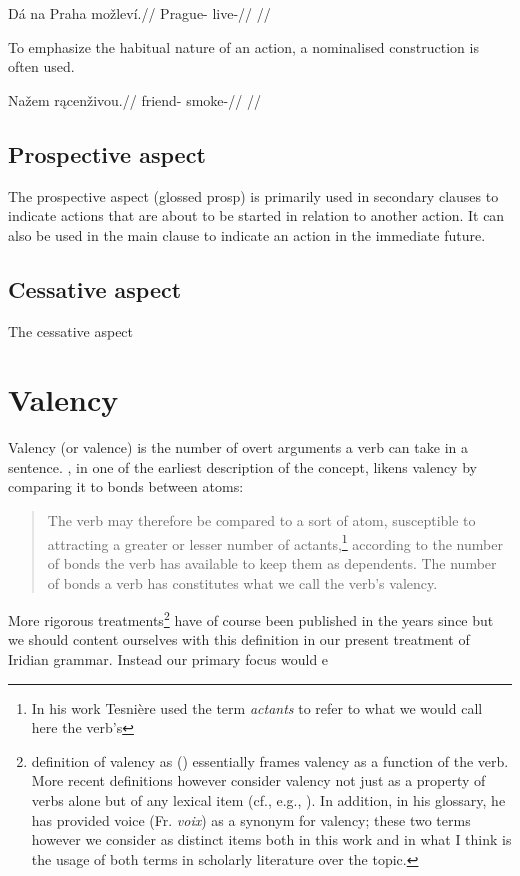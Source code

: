 \pex
\begingl
\gla Dá na Praha možleví.//
\glb {} \Loc{} Prague-\Acc{} live-//
\glft {} //
\endgl
\xe

To emphasize the habitual nature of an action, a nominalised construction is often used.

\pex
\begingl
\gla Nažem r\k{a}cenživou.//
\glb friend-\First{}\Sg{} smoke-//
\glft {} //
\endgl
\xe

\subsection{Prospective aspect}
\par The prospective aspect (glossed {\sc prosp}) is primarily used in secondary clauses to indicate actions that are about to be started in relation to another action. It can also be used in the main clause to indicate an action in the immediate future.

\subsection{Cessative aspect}
The cessative aspect

\section{Valency}

Valency (or valence) is the number of overt arguments a verb can take in a sentence. \textcite[239]{tesniere1965}, in one of the earliest description of the concept, likens valency by comparing it to bonds between atoms:
\begin{quotation}
	\small
The verb may therefore be compared to a sort of atom, susceptible to attracting a greater or lesser number of actants,\footnote{In his work Tesni\`ere used the term \emph{actants} to refer to what we would call here the verb's } according to the number of bonds the verb has available to keep them as dependents. The number of bonds a verb has constitutes what we call the verb's valency.
\end{quotation}

More rigorous treatments\footnote{ definition of valency as  () essentially frames valency as a function of the verb. More recent definitions however consider valency not just as a property of verbs alone but of any lexical item (cf., e.g., \cite{matthews1997,trask1993}). In addition, in his glossary, he has provided voice (Fr. \emph{voix}) as a synonym for valency; these two terms however we consider as distinct items both in this work and in what I think is the usage of both terms in scholarly literature over the topic.} have of course been published in the years since but we should content ourselves with this definition in our present treatment of Iridian grammar. Instead our primary focus would e

